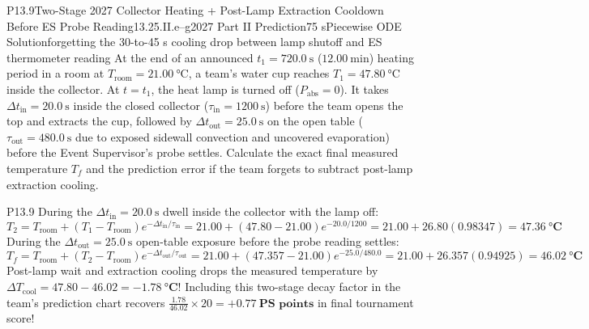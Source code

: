 \begin{problem}{P13.9}{Two-Stage 2027 Collector Heating + Post-Lamp Extraction Cooldown Before ES Probe Reading}{13.2}{5.II.e--g}{2027 Part II Prediction}{75 s}{Piecewise ODE Solution}{forgetting the 30-to-45 s cooling drop between lamp shutoff and ES thermometer reading}
At the end of an announced $t_1 = \SI{720.0}{\second}$ ($\SI{12.00}{\minute}$) heating period in a room at $T_{\mathrm{room}} = \SI{21.00}{\celsius}$, a team's water cup reaches $T_1 = \SI{47.80}{\celsius}$ inside the collector. At $t = t_1$, the heat lamp is turned off ($P_{\mathrm{abs}} = 0$). It takes $\Delta t_{\mathrm{in}} = \SI{20.0}{\second}$ inside the closed collector ($\tau_{\mathrm{in}} = \SI{1200}{\second}$) before the team opens the top and extracts the cup, followed by $\Delta t_{\mathrm{out}} = \SI{25.0}{\second}$ on the open table ($\tau_{\mathrm{out}} = \SI{480.0}{\second}$ due to exposed sidewall convection and uncovered evaporation) before the Event Supervisor's probe settles. Calculate the exact final measured temperature $T_f$ and the prediction error if the team forgets to subtract post-lamp extraction cooling.
\end{problem}
\begin{solution}{P13.9}
During the $\Delta t_{\mathrm{in}} = \SI{20.0}{\second}$ dwell inside the collector with the lamp off:
\[
  T_2 = T_{\mathrm{room}} + \left(T_1 - T_{\mathrm{room}}\right)e^{-\Delta t_{\mathrm{in}}/\tau_{\mathrm{in}}} = 21.00 + (47.80 - 21.00)e^{-20.0/1200} = 21.00 + 26.80(0.98347) = \mathbf{\SI{47.36}{\celsius}}
\]
During the $\Delta t_{\mathrm{out}} = \SI{25.0}{\second}$ open-table exposure before the probe reading settles:
\[
  T_f = T_{\mathrm{room}} + \left(T_2 - T_{\mathrm{room}}\right)e^{-\Delta t_{\mathrm{out}}/\tau_{\mathrm{out}}} = 21.00 + (47.357 - 21.00)e^{-25.0/480.0} = 21.00 + 26.357(0.94925) = \mathbf{\SI{46.02}{\celsius}}
\]
Post-lamp wait and extraction cooling drops the measured temperature by $\Delta T_{\mathrm{cool}} = 47.80 - 46.02 = \mathbf{-\SI{1.78}{\celsius}}$! Including this two-stage decay factor in the team's prediction chart recovers $\frac{1.78}{46.02}\times 20 = \mathbf{+\SI{0.77}{\text{PS points}}}$ in final tournament score!
\end{solution}

